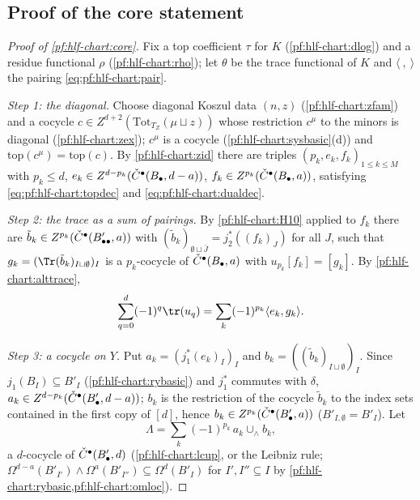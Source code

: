 \subsection{Proof of the core statement}\label{pf:hlf-chart:ss:core}

\begin{proof}[Proof of \cref{pf:hlf-chart:core}]
Fix a top coefficient $\tau$ for $K$ (\cref{pf:hlf-chart:dlog}) and a residue functional $\rho$ (\cref{pf:hlf-chart:rho}); let $\theta$ be the trace
functional of $K$ and $\langle\ ,\ \rangle$ the pairing \eqref{eq:pf:hlf-chart:pair}.

\emph{Step 1: the diagonal.} Choose diagonal Koszul data $(n,z)$ (\cref{pf:hlf-chart:zfam}) and a cocycle $c\in Z^{d+2}(\mathrm{Tot}_{T_Z}(\mu\sqcup z))$
whose restriction $c^\mu$ to the minors is diagonal (\cref{pf:hlf-chart:zex}); $c^\mu$ is a cocycle (\cref{pf:hlf-chart:sysbasic}(d)) and
$\mathrm{top}(c^\mu)=\mathrm{top}(c)$. By \cref{pf:hlf-chart:zid} there are triples $(p_k,e_k,f_k)_{1\le k\le M}$ with $p_k\le d$,
$e_k\in Z^{d-p_k}(\check{C}^\bullet(B_\bullet,d-a))$, $f_k\in Z^{p_k}(\check{C}^\bullet(B_\bullet,a))$, satisfying \eqref{eq:pf:hlf-chart:topdec} and
\eqref{eq:pf:hlf-chart:dualdec}.

\emph{Step 2: the trace as a sum of pairings.} By \ref{pf:hlf-chart:H10} applied to $f_k$ there are $\tilde b_k\in Z^{p_k}(\check{C}^\bullet(B'_{\bullet\bullet},a))$
with $(\tilde b_k)_{\emptyset\sqcup\bar J}=j_2^*((f_k)_J)$ for all $J$, such that $g_k=(\Tr(\tilde b_k)_{I\sqcup\emptyset})_I$ is a $p_k$-cocycle of
$\check{C}^\bullet(B_\bullet,a)$ with $u_{p_k}[f_k]=[g_k]$. By \cref{pf:hlf-chart:alttrace},
\begin{equation}\label{eq:pf:hlf-chart:step2}
  \sum_{q=0}^d(-1)^q\tr(u_q)=\sum_k(-1)^{p_k}\langle e_k,g_k\rangle .
\end{equation}

\emph{Step 3: a cocycle on $Y$.} Put $a_k=(j_1^*(e_k)_I)_I$ and $b_k=((\tilde b_k)_{I\sqcup\emptyset})_I$. Since $j_1(B_I)\subseteq B'_I$
(\cref{pf:hlf-chart:rybasic}) and $j_1^*$ commutes with $\delta$, $a_k\in Z^{d-p_k}(\check{C}^\bullet(B'_\bullet,d-a))$; $b_k$ is the restriction of the
cocycle $\tilde b_k$ to the index sets contained in the first copy of $[d]$, hence $b_k\in Z^{p_k}(\check{C}^\bullet(B'_\bullet,a))$ ($B'_{I,\emptyset}=B'_I$). Let
\[
  \Lambda=\sum_k(-1)^{p_k}\,a_k\cup_\wedge b_k ,
\]
a $d$-cocycle of $\check{C}^\bullet(B'_\bullet,d)$ (\cref{pf:hlf-chart:lcup}, or the Leibniz rule; $\Omega^{d-a}(B'_{I'})\wedge\Omega^a(B'_{I''})\subseteq\Omega^d(B'_I)$ for
$I',I''\subseteq I$ by \cref{pf:hlf-chart:rybasic,pf:hlf-chart:omloc}).


\end{proof}

